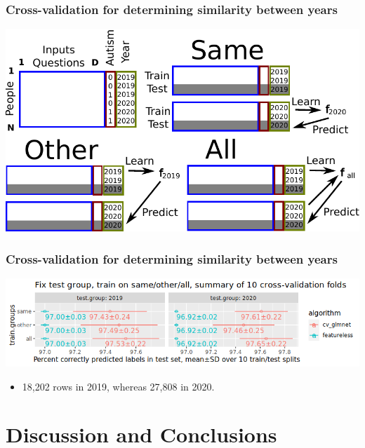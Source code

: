 \documentclass{beamer}
\begin{document}
\begin{frame}
  \frametitle{Cross-validation for determining similarity between years}
  \includegraphics[width=\textwidth]{drawing-cv-same-other-years-4.pdf}
\end{frame}

\begin{frame}
  \frametitle{Cross-validation for determining similarity between years}
  \includegraphics[width=\textwidth]{download-nsch-mlr3batchmark-registry-predict-new-year.png}
  \begin{itemize}
  \item 18,202 rows in 2019, whereas 27,808 in 2020.
  \end{itemize}
\end{frame}

\section{Discussion and Conclusions}
\end{document}
